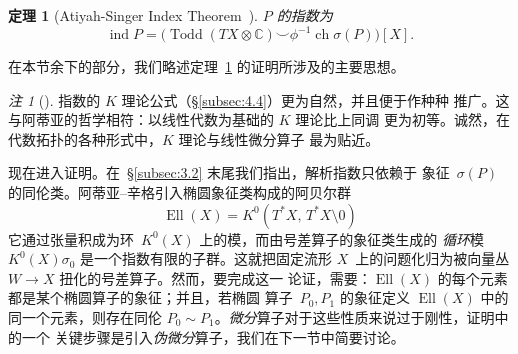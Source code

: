 \documentclass[11pt]{amsart}
\theoremstyle{definition}
\theoremstyle{remark}
\newtheorem{remark}[equation]{注}
\theoremstyle{plain}
\newtheorem{theorem}[equation]{定理}
\numberwithin{equation}{section}
\renewcommand{\:}{\colon}
\newcommand{\Ahat}{{\hat A}}
\newcommand{\CC}{{\mathbb C}}
\newcommand{\ZZ}{{\mathbb Z}}
\DeclareMathOperator{\ch}{ch}
\DeclareMathOperator{\ind}{ind}
\newcommand{\inv}{^{-1}}
\DeclareMathOperator{\Ell}{Ell}
\DeclareMathOperator{\Todd}{Todd}
\begin{document}

  \begin{theorem}[Atiyah-Singer Index Theorem~\cite{AS1}]\label{thm:5}
 $P$ 的指数为
  \begin{equation}\label{eq:44}
     \ind P = \bigl(\Todd(TX\otimes \CC)\smallsmile \phi \inv \ch \sigma
     (P)\bigr)[X].  
  \end{equation} 
  \end{theorem}

\noindent
 在本节余下的部分，我们略述定理~\ref{thm:5} 的证明所涉及的主要思想。


  \begin{remark}[]\label{thm:6}
 指数的 $K$ 理论公式（§\ref{subsec:4.4}）更为自然，并且便于作种种
推广。这与阿蒂亚的哲学相符：以线性代数为基础的 $K$ 理论比上同调
更为初等。诚然，在代数拓扑的各种形式中，$K$ 理论与线性微分算子
最为贴近。
  \end{remark}


现在进入证明。在~\S\ref{subsec:3.2} 末尾我们指出，解析指数只依赖于
象征~$\sigma (P)$ 的同伦类。阿蒂亚–辛格引入椭圆象征类构成的阿贝尔群
  \begin{equation}\label{eq:45}
     \Ell(X) = K^0(T^*X,\,T^*X\setminus 0) 
  \end{equation}
它通过张量积成为环~$K^0(X)$ 上的模，而由号差算子的象征类生成的
\emph{循环}模 $K^0(X)\sigma _0$ 是一个指数有限的子群。这就把固定流形
$X$~上的问题化归为被向量丛 $W\to X$ 扭化的号差算子。然而，要完成这一
论证，需要：$\Ell(X)$ 的每个元素都是某个椭圆算子的象征；并且，若椭圆
算子~$P_0,P_1$ 的象征定义 $\Ell(X)$ 中的同一个元素，则存在同伦
$P_0\sim P_1$。\emph{微分}算子对于这些性质来说过于刚性，证明中的一个
关键步骤是引入\emph{伪微分}算子，我们在下一节中简要讨论。
\end{document}
